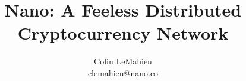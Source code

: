 \documentclass[journal]{IEEEtran}
\begin{document}
\title{Nano: A Feeless Distributed Cryptocurrency Network}

\author{Colin LeMahieu\\clemahieu@nano.co}%


% 
%


\maketitle


\end{document}
